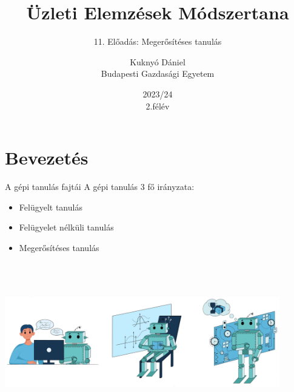 \documentclass[english, aspectratio=169]{beamer}
\makeatletter
\newcommand\makebeamertitle{\frame{\maketitle}}
\let\origtableofcontents=\tableofcontents
\def\tableofcontents{\@ifnextchar[{\origtableofcontents}{\gobbletableofcontents}}
\def\gobbletableofcontents#1{\origtableofcontents}
\makeatother
\begin{document}
\section{Bevezetés}
\title[]{Üzleti Elemzések Módszertana}
\subtitle{11. Előadás: Megerősítéses tanulás}
\author[Kuknyó Dániel]{Kuknyó Dániel\\Budapesti Gazdasági Egyetem}
\date{2023/24\\2.félév}
\makebeamertitle

\begin{frame}
\tableofcontents{}
\end{frame}

\begin{frame}
\tableofcontents[currentsection]
\end{frame}

\begin{frame}{A gépi tanulás fajtái}
A gépi tanulás 3 fő irányzata:
\begin{itemize}
	\item Felügyelt tanulás
	\item Felügyelet nélküli tanulás
	\item Megerősítéses tanulás
\end{itemize}
\begin{center}
\includegraphics[width=12cm, height=7cm, keepaspectratio]{images/reinforcement_1.png}
\end{center}
\end{frame}
\end{document}
